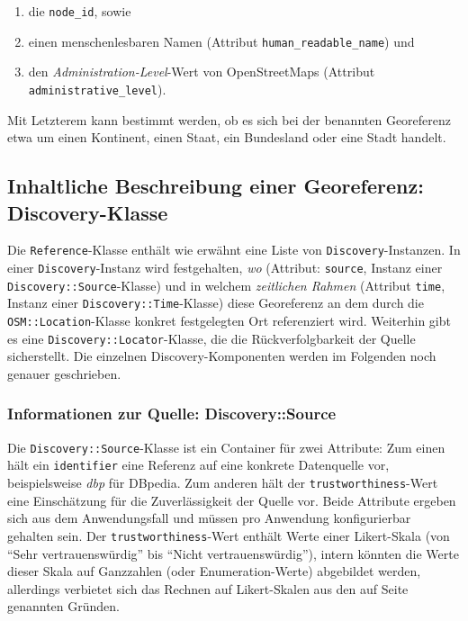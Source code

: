 \begin{enumerate}
  \item die \texttt{node\_id}, sowie 
  \item einen menschenlesbaren Namen (Attribut \texttt{human\_readable\_name}) und 
  \item den \textit{Administration-Level}-Wert von OpenStreetMaps\cite{OSMadminlevel} (Attribut \texttt{administrative\_level}). 
\end{enumerate}

Mit Letzterem kann bestimmt werden, ob es sich bei der benannten Georeferenz etwa um einen Kontinent, einen Staat, ein Bundesland oder eine Stadt handelt.

\subsection{Inhaltliche Beschreibung einer Georeferenz: Discovery-Klasse}
Die \texttt{Reference}-Klasse enthält wie erwähnt eine Liste von \texttt{Discovery}-Instanzen. In einer \texttt{Discovery}-Instanz wird festgehalten, \textit{wo} (Attribut: \texttt{source}, Instanz einer \texttt{Discovery::Source}-Klasse) und in welchem \textit{zeitlichen Rahmen} (Attribut \texttt{time}, Instanz einer \texttt{Discovery::Time}-Klasse) diese Georeferenz an dem durch die \texttt{OSM::Location}-Klasse konkret festgelegten Ort referenziert wird. Weiterhin gibt es eine \texttt{Discovery::Locator}-Klasse, die die Rückverfolgbarkeit der Quelle sicherstellt. Die einzelnen Discovery-Komponenten werden im Folgenden noch genauer geschrieben.

\subsubsection{Informationen zur Quelle: Discovery::Source}
Die \texttt{Discovery::Source}-Klasse ist ein Container für zwei Attribute: Zum einen hält ein \texttt{identifier} eine Referenz auf eine konkrete Datenquelle vor, beispielsweise \textit{dbp} für DBpedia. Zum anderen hält der \texttt{trustworthiness}-Wert eine Einschätzung für die Zuverlässigkeit der Quelle vor. Beide Attribute ergeben sich aus dem Anwendungsfall und müssen pro Anwendung konfigurierbar gehalten sein. Der \texttt{trustworthiness}-Wert enthält Werte einer Likert-Skala (von ``Sehr vertrauenswürdig'' bis ``Nicht vertrauenswürdig''), intern könnten die Werte dieser Skala auf Ganzzahlen (oder Enumeration-Werte) abgebildet werden, allerdings verbietet sich das Rechnen auf Likert-Skalen aus den auf Seite \pageref{calc_likert} genannten Gründen.

